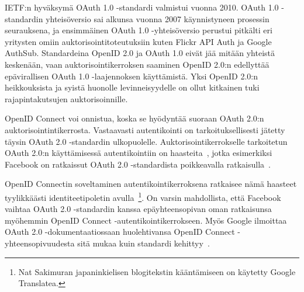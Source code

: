 \documentclass[finnish,gradu]{tktltiki}
\begin{document}
  IETF:n hyväksymä OAuth 1.0 -standardi valmistui vuonna 2010. OAuth 1.0 -standardin yhteisöversio sai alkunsa vuonna 2007 käynnistyneen prosessin seurauksena, ja ensimmäinen OAuth 1.0 -yhteisöversio perustui pitkälti eri yritysten omiin auktorisointitoteutuksiin kuten Flickr API Auth ja Google AuthSub. Standardeina OpenID 2.0 ja OAuth 1.0 eivät jää mitään yhteistä keskenään, vaan auktorisointikerroksen saaminen OpenID 2.0:n edellyttää epävirallisen OAuth 1.0 -laajennoksen käyttämistä. Yksi OpenID 2.0:n heikkouksista ja syistä huonolle levinneisyydelle on ollut kitkainen tuki rajapintakutsujen auktorisoinnille.

  OpenID Connect voi onnistua, koska se hyödyntää suoraan OAuth 2.0:n auktorisointintikerrosta. Vastaavasti autentikointi on tarkoituksellisesti jätetty täysin OAuth 2.0 -standardin ulkopuolelle. Auktorisointikerrokselle tarkoitetun OAuth 2.0:n käyttämisessä autentikointiin on haasteita~\cite{bradley_oauth_authentication_problem_2012, bradley_oauth_implicit_flow_vulnerability_2012}, jotka esimerkiksi Facebook on ratkaissut OAuth 2.0 -standardista poikkeavalla ratkaisulla~\cite{bradley_facebook_id_tokens_2012, facebook_oauth2_signed_request}.

  OpenID Connectin soveltaminen autentikointikerroksena ratkaisee nämä haasteet tyylikkäästi identiteetipoletin avulla~\cite{bradley_openid_c_id_token_2012, bradley_facebook_for_authentication_2012, sakimura_oauth_authentication_problem_2012}\footnote{Nat Sakimuran japaninkielisen blogitekstin kääntämiseen on käytetty Google Translatea.}. On varsin mahdollista, että Facebook vaihtaa OAuth 2.0 -standardin kanssa epäyhteensopivan oman ratkaisunsa~\cite{bradley_facebook_id_tokens_2012, facebook_oauth2_signed_request} myöhemmin OpenID Connect -autentikointikerrokseen. Myös Google ilmoittaa OAuth 2.0 -dokumentaatiossaan huolehtivansa OpenID Connect -yhteensopivuudesta sitä mukaa kuin standardi kehittyy~\cite{google_oauth2_login}.



\end{document}
